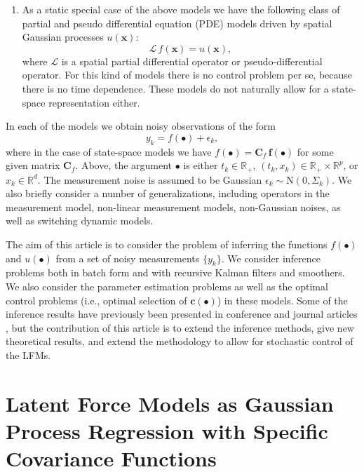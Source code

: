 \documentclass[journal]{IEEEtran}
\begin{document}
\begin{enumerate}
\item As a static special case of the above models we have the following class of partial and pseudo differential equation (PDE) models driven by spatial Gaussian processes $u(\mathbf{x})$:
%
\begin{equation}
  \mathcal{L} \, f(\mathbf{x}) = u(\mathbf{x}),
\end{equation}
%
where $\mathcal{L}$ is a spatial partial differential operator or pseudo-differential operator. For this kind of models there is no control problem per se, because there is no time dependence.  These models do not naturally allow for a state-space representation either.
\end{enumerate}

In each of the models we obtain noisy observations of the form
%
\begin{equation}
  y_k = f(\bullet) + \epsilon_k,
\end{equation}
%
where in the case of state-space models we have $f(\bullet) = \mathbf{C}_f \, \mathbf{f}(\bullet)$ for some given matrix $\mathbf{C}_f$. Above, the argument $\bullet$ is either $t_k \in \mathbb{R}_+$, $(t_k,x_k) \in \mathbb{R}_+ \times \mathbb{R}^p$, or $x_k \in \mathbb{R}^d$. The measurement noise is assumed to be Gaussian $\epsilon_k \sim \mathrm{N}(0,\Sigma_k)$. We also briefly consider a number of generalizations, including operators in the measurement model, non-linear measurement models, non-Gaussian noises, as well as switching dynamic models.

The aim of this article is to consider the problem of inferring the functions $f(\bullet)$ and $u(\bullet)$ from a set of noisy measurements $\{ y_k \}$. We consider inference problems both in batch form and with recursive Kalman filters and smoothers. We also consider the parameter estimation problems as well as the optimal control problems (i.e., optimal selection of $\mathbf{c}(\bullet)$) in these models. Some of the inference results have previously been presented in conference and journal articles \cite{Alvarez+Luengo+Lawrence:2009,Alvarez:2010,Alvarez+Luengo+Lawrence:2013,Hartikainen+Sarkka:2011,Hartikainen+Seppanen+Sarkka:2012}, but the contribution of this article is to extend the inference methods, give new theoretical results, and extend the methodology to allow for stochastic control of the LFMs.

\section{Latent Force Models as Gaussian Process Regression with Specific Covariance Functions}
\end{document}
